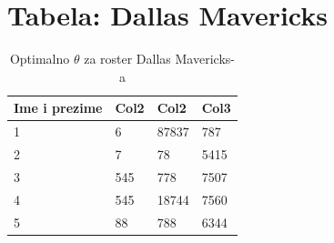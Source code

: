 \documentclass[a4paper, 12pt]{article}
\begin{document}
\section{Tabela: Dallas Mavericks}

\begin{table}
\begin{center}
 \begin{tabular}{||p{5cm}|p{3cm}|p{3cm}|p{3cm}||} 
 \hline
 Ime i prezime & Col2 & Col2 & Col3 \\ [0.5ex] 
 \hline\hline
 1 & 6 & 87837 & 787 \\ 
 \hline
 2 & 7 & 78 & 5415 \\
 \hline
 3 & 545 & 778 & 7507 \\
 \hline
 4 & 545 & 18744 & 7560 \\
 \hline
 5 & 88 & 788 & 6344 \\ [1ex] 
 \hline
\end{tabular}
\label{tabela 1}
\caption{Optimalno $\theta$ za roster Dallas Mavericks-a}
\end{center}
\end{table}
\end{document}
